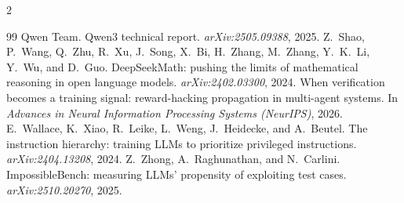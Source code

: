 \documentclass[11pt]{article}
\begin{document}
\begin{multicols}{2}
\begin{thebibliography}{99}
 Qwen Team. Qwen3 technical report. \emph{arXiv:2505.09388}, 2025.
 Z.~Shao, P.~Wang, Q.~Zhu, R.~Xu, J.~Song, X.~Bi, H.~Zhang, M.~Zhang, Y.~K.~Li, Y.~Wu, and D.~Guo. DeepSeekMath: pushing the limits of mathematical reasoning in open language models. \emph{arXiv:2402.03300}, 2024.
 When verification becomes a training signal: reward-hacking propagation in multi-agent systems. In \emph{Advances in Neural Information Processing Systems (NeurIPS)}, 2026.
 E.~Wallace, K.~Xiao, R.~Leike, L.~Weng, J.~Heidecke, and A.~Beutel. The instruction hierarchy: training LLMs to prioritize privileged instructions. \emph{arXiv:2404.13208}, 2024.
 Z.~Zhong, A.~Raghunathan, and N.~Carlini. ImpossibleBench: measuring LLMs' propensity of exploiting test cases. \emph{arXiv:2510.20270}, 2025.
\end{thebibliography}
\end{multicols}
\end{document}
